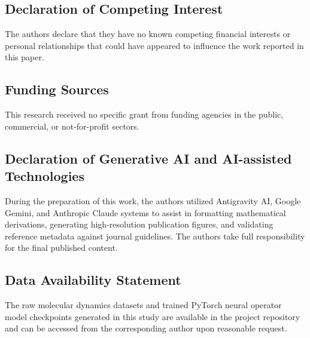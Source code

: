 \documentclass[3p,preprint,12pt,numbers,square,sort&compress]{elsarticle}
\begin{document}
\subsection*{Declaration of Competing Interest}
The authors declare that they have no known competing financial interests or personal relationships that could have appeared to influence the work reported in this paper.

\subsection*{Funding Sources}
This research received no specific grant from funding agencies in the public, commercial, or not-for-profit sectors.

\subsection*{Declaration of Generative AI and AI-assisted Technologies}
During the preparation of this work, the authors utilized Antigravity AI, Google Gemini, and Anthropic Claude systems to assist in formatting mathematical derivations, generating high-resolution publication figures, and validating reference metadata against journal guidelines. The authors take full responsibility for the final published content.

\subsection*{Data Availability Statement}
The raw molecular dynamics datasets and trained PyTorch neural operator model checkpoints generated in this study are available in the project repository and can be accessed from the corresponding author upon reasonable request.
\end{document}
